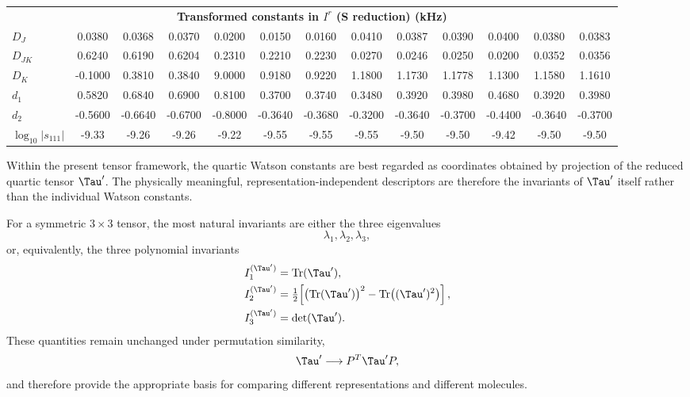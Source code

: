 \begin{table}[ht]
\begin{tabular}{lcccccccccccc}
  \midrule
  \multicolumn{13}{c}{\textbf{Transformed constants in $I^r$ (S reduction) (kHz)}} \\

  $D_J$ &
  0.0380 & 0.0368 & 0.0370 &
  0.0200 & 0.0150 & 0.0160 &
  0.0410 & 0.0387 & 0.0390 &
  0.0400 & 0.0380 & 0.0383 \\

  $D_{JK}$ &
  0.6240 & 0.6190 & 0.6204 &
  0.2310 & 0.2210 & 0.2230 &
  0.0270 & 0.0246 & 0.0250 &
  0.0200 & 0.0352 & 0.0356 \\

  $D_K$ &
  -0.1000 & 0.3810 & 0.3840 &
  9.0000 & 0.9180 & 0.9220 &
  1.1800 & 1.1730 & 1.1778 &
  1.1300 & 1.1580 & 1.1610 \\

  $d_1$ &
  0.5820 & 0.6840 & 0.6900 &
  0.8100 & 0.3700 & 0.3740 &
  0.3480 & 0.3920 & 0.3980 &
  0.4680 & 0.3920 & 0.3980 \\

  $d_2$ &
  -0.5600 & -0.6640 & -0.6700 &
  -0.8000 & -0.3640 & -0.3680 &
  -0.3200 & -0.3640 & -0.3700 &
  -0.4400 & -0.3640 & -0.3700 \\

  $\log_{10}|s_{111}|$ &
  -9.33 & -9.26 & -9.26 &
  -9.22 & -9.55 & -9.55 &
  -9.55 & -9.50 & -9.50 &
  -9.42 & -9.50 & -9.50 \\

  \bottomrule
  \end{tabular}

  \label{table:new_results}

\end{table}

Within the present tensor framework, the quartic Watson constants are
best regarded as coordinates obtained by projection of the reduced
quartic tensor $\Tau'$.  The physically meaningful,
representation-independent descriptors are therefore the invariants of
$\Tau'$ itself rather than the individual Watson constants.

For a symmetric $3\times 3$ tensor, the most natural invariants are
either the three eigenvalues
\[
\lambda_1,\lambda_2,\lambda_3,
\]
or, equivalently, the three polynomial invariants
\begin{align}
I_1^{(\Tau')} &= \mathrm{Tr}(\Tau'),\\
I_2^{(\Tau')} &= \tfrac12\!\left[
\bigl(\mathrm{Tr}(\Tau')\bigr)^2-\mathrm{Tr}\bigl((\Tau')^2\bigr)
\right],\\
I_3^{(\Tau')} &= \det(\Tau').
\end{align}
These quantities remain unchanged under permutation similarity,
\[
\Tau' \longrightarrow P^T\Tau' P,
\]
and therefore provide the appropriate basis for comparing different
representations and different molecules.

